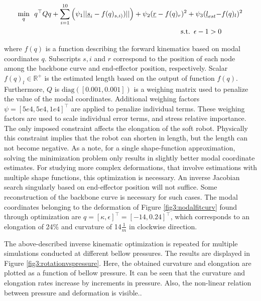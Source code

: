\begin{equation}
\begin{aligned}
\min_{q} \hspace{5pt}  q^\top Q q  + \sum_{i=1}^{10}\Big(\psi_1 ||\text{\underbar{$s$}}_{i} - f(q)_{s,i)})|| \Big) +   \psi_2(\text{\underbar{$r$}}  - f(q)_{r})^2 +  \psi_3(\text{\underbar{$l$}}_{est} - & f(q)_l)^2  \\ 
\text{s.t.} \hspace{5pt} \epsilon - 1 > 0
\end{aligned}
\label{eq3:optim}
\end{equation}


where $f(q)$ is a function describing the forward kinematics based on modal coordinates $q$. Subscripts $s,i$ and $r$ correspond to the position of each node among the backbone curve and end-effector position, respectively. Scalar $f(q)_l \in \mathbb{R}^+$ is the estimated length based on the output of function $f(q)$. Furthermore, $Q$ is $\text{diag}([0.001,0.001])$ is a weighing matrix used to penalize the value of the modal coordinates. Additional weighing factors $\psi = [5e4,5e4,1e4]^\top$ are applied to penalize individual terms. These weighing factors are used to scale individual error terms, and stress relative importance. The only imposed constraint affects the elongation of the soft robot. Physically this constraint implies that the robot can shorten in length, but the length can not become negative. As a note, for a single shape-function approximation, solving the minimization problem only results in slightly better modal coordinate estimates. For studying more complex deformations, that involve estimations with multiple shape functions, this optimization is necessary. An inverse Jacobian search singularly based on end-effector position will not suffice. Some reconstruction of the backbone curve is necessary for such cases. The modal coordinates belonging to the deformation of Figure \ref{fig3:nodalfitcurv} found through optimization are $q = [\kappa,\epsilon]^\top = [-14,0.24]^\top$, which corresponds to an elongation of 24\% and curvature of 14$\frac{1}{m}$ in clockwise direction.


The above-described inverse kinematic optimization is repeated for multiple simulations conducted at different bellow pressures. The results are displayed in Figure \ref{fig3:rotationvspressure}. Here, the obtained curvature and elongation are plotted as a function of bellow pressure. It can be seen that the curvature and elongation rates increase by increments in pressure. Also, the non-linear relation between pressure and deformation is visible..





